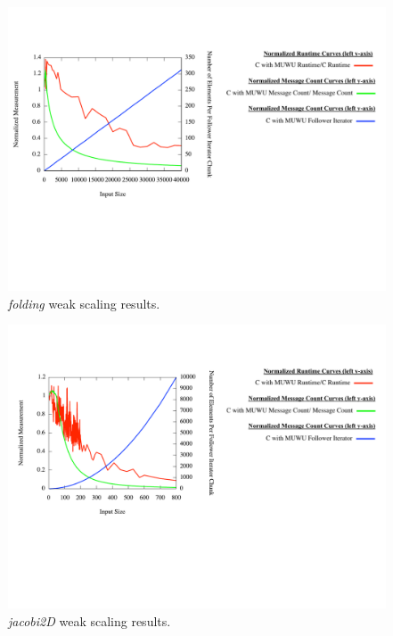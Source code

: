 \begin{figure}
\begin{center}
\includegraphics[width=\linewidth]{./Figures/input_variation_exp/folding.pdf}
\caption{\textit{folding} weak scaling results.}
\label{folding_weak_scaling}
\end{center}
\end{figure}

\begin{figure}
\begin{center}
\includegraphics[width=\linewidth]{./Figures/input_variation_exp/jacobi-2d.pdf}
\caption{\textit{jacobi2D} weak scaling results.}
\label{jacobi-2d_weak_scaling}
\end{center}
\end{figure}

